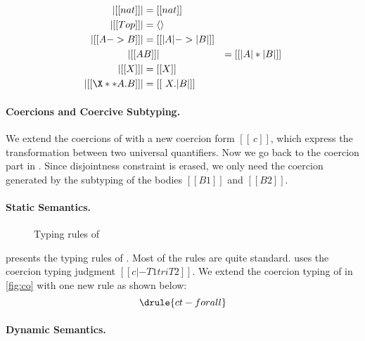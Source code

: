\begin{definition} \label{def:type:translate:fi}
  \begin{align*}
    | [[nat]] | &= [[nat]] \\
    | [[Top]] | &= \langle \rangle \\
    | [[A -> B]]  | &= [[ | A | -> | B |  ]] \\
    | [[ A & B  ]] | &= [[ | A | * | B |  ]] \\
    | [[ X  ]] | &= [[ X ]] \\
    | [[ \X ** A . B ]] | &= [[ \ X . | B | ]]
  \end{align*}
\end{definition}


\paragraph{Coercions and Coercive Subtyping.}

We extend the coercions of \tname with a new coercion form $[[ \ c ]]$, which
express the transformation between two universal quantifiers. Now we go back to
the coercion part in . Since disjointness constraint is erased,
we only need the coercion generated by the subtyping of the bodies $[[B1]]$ and
$[[B2]]$.


\paragraph{\tnamee Static Semantics.}


\begin{figure}
  \centering
  \caption{Typing rules of \tnamee}
  \label{fig:typing:fco}
\end{figure}

 presents the typing rules of \tnamee. Most of the rules
are quite standard.  uses the coercion typing judgment $[[ c |- T1 tri T2 ]]$.
We extend the coercion typing of \tname in \cref{fig:co} with one new rule
 as shown below:
\[
  \drule{ct-forall}
\]


\paragraph{\tnamee Dynamic Semantics.}

